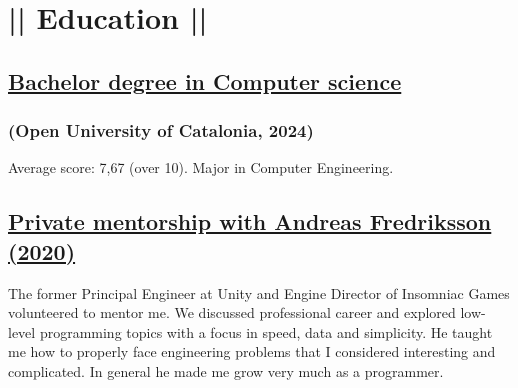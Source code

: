 \section*{|| Education ||}
\subsection*{\underline{Bachelor degree in Computer science}}
\subsubsection*{(Open University of Catalonia, 2024)}
Average score: 7,67 (over 10). Major in Computer Engineering.

\subsection*{\underline{Private mentorship with Andreas Fredriksson (2020)}}
The former Principal Engineer at Unity and Engine Director of Insomniac Games volunteered to mentor me. We discussed professional career and explored low-level programming topics with a focus in speed, data and simplicity. He taught me how to properly face engineering problems that I considered interesting and complicated. In general he made me grow very much as a programmer.